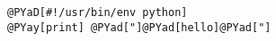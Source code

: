 \begin{frame}[fragile]
\begin{Verbatim}[commandchars=@\[\]]
@PYaD[#!/usr/bin/env python]
@PYay[print] @PYad["]@PYad[hello]@PYad["]
\end{Verbatim}
\end{frame}